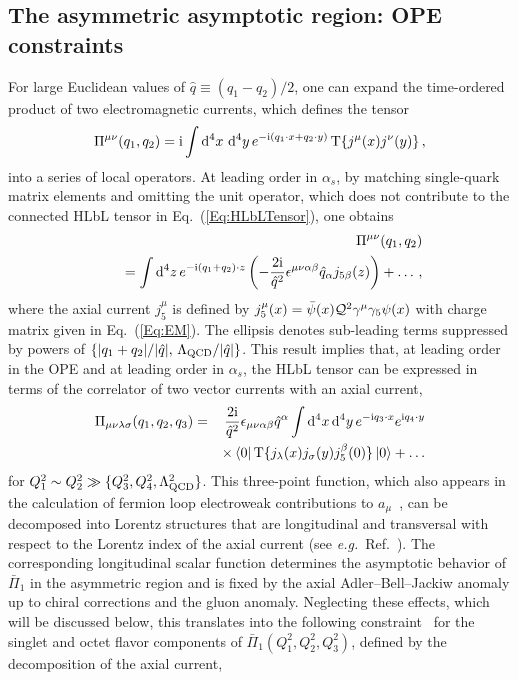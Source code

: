 \subsection{The asymmetric asymptotic region: OPE constraints}
\label{Sec:OPE}
For large Euclidean values of $\hat{q} \equiv (q_1 - q_2)/2$, one can expand the time-ordered product of two electromagnetic currents, which defines the tensor
\begin{equation}
\Pi^{\mu\nu}(q_1, q_2) = \text{i} \int \mathop{}\!\mathrm{d}^4 x\, \mathop{}\!\mathrm{d}^4 y \,e^{-\text{i}(q_1\cdot x + q_2 \cdot y)}\operatorname{T}\{j^\mu (x) j^\nu (y)\}\,,
\label{Eq:Pimunu}
\end{equation}
into a series of local operators. At leading order in $\alpha_s$, by matching single-quark matrix elements and omitting the unit operator, which does not contribute to the connected HLbL tensor in Eq.~(\ref{Eq:HLbLTensor}), one obtains~\cite{Bjorken:1966jh}
\begin{eqnarray}
&&\Pi^{\mu\nu}(q_1, q_2)\nonumber\\
&&\quad = \int \mathop{}\!\mathrm{d}^4 z\, e^{-\text{i}(q_1 + q_2) \cdot z} \left(-\frac{2\text{i}}{\hat{q}^2}\epsilon^{\mu\nu\alpha\beta} \hat{q}_\alpha j_{5\beta}(z)\right) + \dots\, ,
\label{Eq:OPE}
\end{eqnarray}
where the axial current $j_5^\mu$ is defined by $j_5^\mu(x)=\bar{\psi}(x)\mathcal{Q}^2 \gamma^\mu \gamma_5 \psi(x)$ with charge matrix given in Eq.~(\ref{Eq:EM}). The ellipsis denotes sub-leading terms suppressed by powers of $\{|q_1+q_2|/|\hat{q}|,\,\allowbreak\Lambda_{\rm QCD}/|\hat{q}|\}$. This result implies that, at leading order in the OPE and at leading order in $\alpha_s$, the HLbL tensor can be expressed in terms of the correlator of two vector currents with an axial current,
\begin{eqnarray}
\Pi_{\mu\nu\lambda\sigma}(q_1,q_2,q_3) & = & \frac{2 \text{i}}{\hat{q}^2} \epsilon_{\mu\nu\alpha\beta} \hat{q}^\alpha \int \mathop{}\!\mathrm{d}^4 x\mathop{}\!\mathrm{d}^4 y\, e^{-\text{i} q_3\cdot x} e^{\text{i} q_4\cdot y} \nonumber \\
&& \times\bra{0} \operatorname{T} \{j_\lambda(x) j_\sigma(y) j_5^\beta(0)\}\ket{0} + \dots \nonumber \\
\end{eqnarray}
for $Q_1^2 \sim Q_2^2 \gg \{Q_3^2,Q_4^2,\Lambda_\text{QCD}^2\}$. This three-point function, which also appears in the calculation of fermion loop electroweak contributions to $a_\mu$~\cite{Knecht:2002hr,VVAold}, can be decomposed into Lorentz structures that are longitudinal and transversal with respect to the Lorentz index of the axial current (see {\it e.g.}\ Ref.~\cite{VVA}). The corresponding longitudinal scalar function determines the asymptotic behavior of $\bar{\Pi}_1$ in the asymmetric region and is fixed by the axial Adler--Bell--Jackiw anomaly up to chiral corrections and the gluon anomaly. Neglecting these effects, which will be discussed below, this translates into the following constraint~\cite{BernSDCLong} for the singlet and octet flavor components of $\bar{\Pi}_1(Q_1^2, Q_2^2, Q_3^2)$, defined by the decomposition of the axial current,
